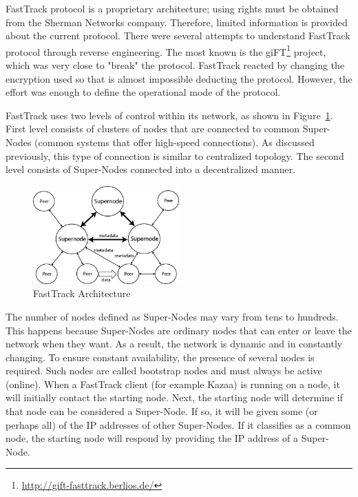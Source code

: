 FastTrack protocol is a proprietary architecture; using rights must be obtained
from the Sherman Networks company. Therefore, limited information is provided
about the current protocol. There were several attempts to understand
FastTrack protocol through reverse engineering. The most known is the
giFT\footnote{\url{http://gift-fasttrack.berlios.de/}}
project, which was very close to "break" the protocol. FastTrack reacted by
changing the encryption used so that is almost impossible deducting the
protocol. However, the effort was enough to define the operational mode of
the protocol.

FastTrack uses two levels of control within its network, as shown in
Figure~\ref{fig:p2p-systems:fasttrack}. First level consists of clusters of
nodes that are connected to common Super-Nodes (common systems that offer
high-speed connections). As discussed previously, this type of connection is
similar to centralized topology. The second level consists of Super-Nodes
connected into a decentralized manner.

\begin{figure}
  \centering
  \includegraphics[width=0.5\textwidth]{src/img/p2p-systems/fasttrack}
  \caption{FastTrack Architecture}
  \label{fig:p2p-systems:fasttrack}
\end{figure}

The number of nodes defined as Super-Nodes may vary from tens to hundreds.
This happens because Super-Nodes are ordinary nodes that can enter or leave the
network when they want. As a result, the network is dynamic and in constantly
changing. To ensure constant availability, the presence of several nodes is
required. Such nodes are called bootstrap nodes and must always be active
(online). When a FastTrack client (for example Kazaa) is running on a node, it
will initially contact the starting node. Next, the starting node will
determine if that node can be considered a Super-Node. If so, it will be given
some (or perhaps all) of the IP addresses of other Super-Nodes. If it
classifies as a common node, the starting node will respond by providing
the IP address of a Super-Node.

